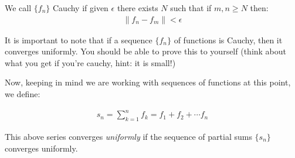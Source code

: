 \begin{defn}
  We call $\{f_n\}$ Cauchy if given $\epsilon$ there exists $N$ such that if $m, n \geq N$ then:
  \begin{align*}
    \| f_n - f_m \| < \epsilon
  \end{align*}
\end{defn}

It is important to note that if a sequence $\{f_n\}$ of functions is Cauchy, then it converges 
uniformly. You should be able to prove this to yourself (think about what you get if you're cauchy, hint: it 
is small!)

Now, keeping in mind we are working with sequences of functions at this point, we define:

\begin{defn}
  \begin{align*}
    s_n = \sum_{k = 1}^{n} f_k = f_1 + f_2 + \cdots f_n
  \end{align*}
\end{defn}

This above series converges \emph{uniformly} if the sequence of partial sums $\{s_n\}$ converges uniformly.
